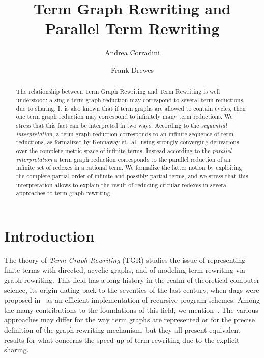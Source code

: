 \documentclass{eptcs}
\title{Term Graph Rewriting and Parallel Term Rewriting}
\author{Andrea Corradini
\institute{Universit\`{a} di Pisa\\ Dipartimento di Informatica}
\email{andrea@di.unipi.it}
\and Frank Drewes
\institute{Department of Computing Science\\Ume\r{a} University}
\email{drewes@cs.unu.se}}
\theoremstyle{plain}
\theoremstyle{definition}
\begin{document}
\maketitle
 
\begin{abstract}
The relationship between Term Graph Rewriting and Term Rewriting is
well understood: a single term graph reduction may correspond to
several term reductions, due to sharing.  It is also known that if
term graphs are allowed to contain cycles, then one term graph
reduction may correspond to infinitely many term reductions. We stress
that this fact can be interpreted in two ways. According to the
\emph{sequential interpretation}, a term graph reduction corresponds
to an infinite sequence of term reductions, as formalized by Kennaway
et.\ al.\ using strongly converging derivations over the complete
metric space of infinite terms. Instead according to the
\emph{parallel interpretation} a term graph reduction corresponds to
the parallel reduction of an infinite set of redexes in a rational
term. We formalize the latter notion by exploiting the complete
partial order of infinite and possibly partial terms, and we stress that
this interpretation allows to explain the result of reducing circular
redexes in several approaches to term graph rewriting.






\end{abstract}

\section{Introduction}




The theory of {\em Term Graph Rewriting\/} (TGR) studies the issue 
of representing finite terms with directed, acyclic graphs, and of
modeling term rewriting via graph rewriting.
This field has a long history in the realm of theoretical
computer science, its origin dating back to the seventies of the last
century, when dags were proposed in~\cite{DBLP:conf/icalp/PaciniMT74}
as an efficient implementation of recursive program schemes.
Among the many contributions to the foundations of this field, we mention~\cite{Sta:CGLE,BEGKPS:TGR,Ken:GRSC,HP:ITRJ,CR:HRJR,DBLP:journals/fuin/AriolaK96,CG:A2CP}.  
The various approaches may differ for the way term graphs are
represented or for the precise definition of the graph rewriting
mechanism, but they all present equivalent results for what
concerns the speed-up of term rewriting due to the explicit sharing.
\end{document}
